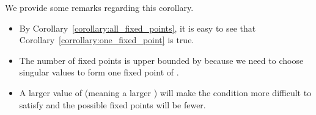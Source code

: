 We provide some remarks regarding this corollary.
\begin{itemize}
\item By Corollary~\ref{corollary:all_fixed_points}, it is easy to see that Corollary~\ref{corrollary:one_fixed_point} is true.
\item The number of fixed points is upper bounded by  because we need to choose  singular values to form one fixed point of .
\item A larger value of  (meaning a larger ) will make the condition  more difficult to satisfy and the possible fixed points will be fewer.
\end{itemize}












